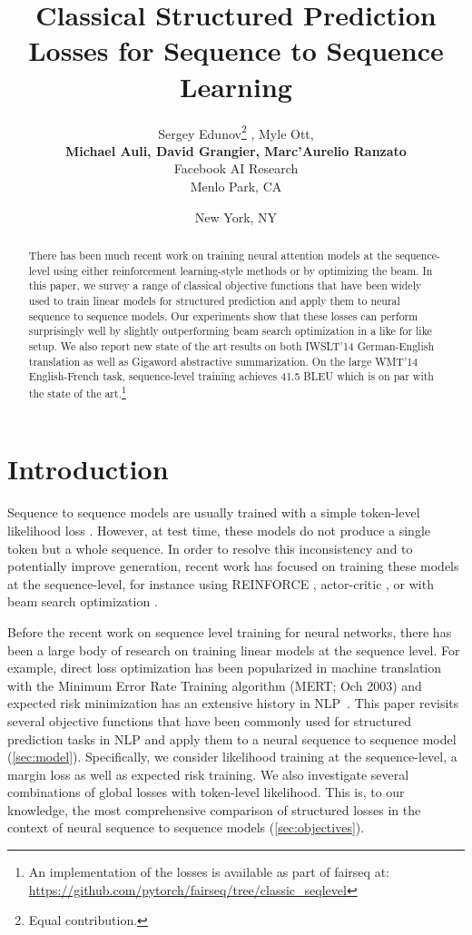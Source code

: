 \documentclass[11pt,a4paper]{article}
\title{Classical Structured Prediction Losses for Sequence to Sequence Learning}
\author{
  Sergey Edunov\thanks{\hspace{0.075in}Equal contribution.} , Myle Ott\samethanks\hspace{0.05in}, \\
  {\bf Michael Auli, David Grangier, Marc'Aurelio Ranzato} \\
  Facebook AI Research \\
  Menlo Park, CA \and New York, NY
}
\date{}
\begin{document}
\maketitle

\begin{abstract}
There has been much recent work on training neural attention models at the sequence-level using either reinforcement learning-style methods or by optimizing the beam. In this paper, we survey a range of classical objective functions that have been widely used to train linear models for structured prediction and apply them to neural sequence to sequence models.
Our experiments show that these losses can perform surprisingly well by slightly outperforming beam search optimization in a like for like setup.
We also report new state of the art results on both IWSLT'14 German-English translation as well as Gigaword abstractive summarization. 
On the large WMT'14 English-French task, sequence-level training achieves 41.5 BLEU which is on par with the state of the art.\footnote{An implementation of the losses is available as part of fairseq at:\\
\url{https://github.com/pytorch/fairseq/tree/classic_seqlevel}}
\end{abstract}

\section{Introduction}

Sequence to sequence models are usually trained with a simple token-level likelihood loss \citep{sutskever2014sequence,bahdanau2014neural}.
However, at test time, these models do not produce a single token but a whole sequence. In order to resolve this inconsistency and to potentially improve generation, recent work has focused on training these models at the sequence-level,
for instance using REINFORCE \citep{ranzato2015sequence}, actor-critic \citep{bahdanau2016ac}, or with beam search optimization \citep{wiseman2016acl}.

Before the recent work on sequence level training for neural networks, there has been a large body of research on training linear models at the sequence level.
For example, direct loss optimization has been popularized in machine translation with the Minimum Error Rate Training algorithm (MERT; Och 2003)\nocite{och:2003:acl} and expected risk minimization has an extensive history in NLP~\cite{smith+eisner2006acl,rosti:2010:wmt,green:2014:wmt}.
This paper revisits several objective functions that have been commonly used for structured prediction tasks in NLP \citep{gimpel+smith2010acl} and apply them to a neural sequence to sequence model \citep{gehring2017icml} (\textsection\ref{sec:model}).
Specifically, we consider likelihood training at the sequence-level, a margin loss as well as expected risk training.
We also investigate several combinations of global losses with token-level likelihood.
This is, to our knowledge, the most comprehensive comparison of structured losses in the context of neural sequence to sequence models (\textsection\ref{sec:objectives}).
\end{document}

